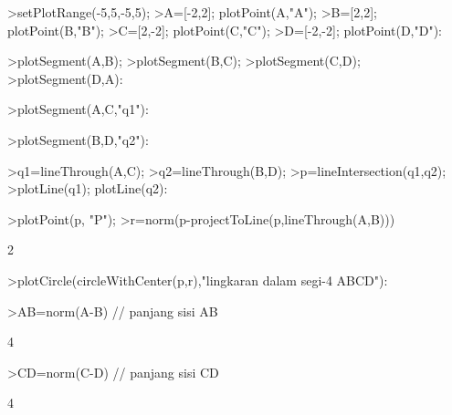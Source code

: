 \documentclass[12pt,Times new roman,letterpaper]{book}
\begin{document}
\begin{eulernootebook}
\begin{eulercomment}
\begin{eulercomment}
\begin{eulernootebook}
\begin{eulercomment}
\begin{eulercomment}
\begin{eulercomment}
\begin{eulercomment}
\begin{eulercomment}
\begin{eulercomment}
\begin{eulernotebook}
\begin{eulercomment}
\begin{eulercomment}
\begin{eulercomment}
\begin{eulercomment}
\begin{eulercomment}
\begin{eulercomment}
\end{eulercomment}
\begin{eulerprompt}
>setPlotRange(-5,5,-5,5);
>A=[-2,2]; plotPoint(A,"A");
>B=[2,2]; plotPoint(B,"B");
>C=[2,-2]; plotPoint(C,"C");
>D=[-2,-2]; plotPoint(D,"D"):
\end{eulerprompt}
\begin{eulerprompt}
>plotSegment(A,B);
>plotSegment(B,C);
>plotSegment(C,D);
>plotSegment(D,A):
\end{eulerprompt}
\begin{eulerprompt}
>plotSegment(A,C,"q1"):
\end{eulerprompt}
\begin{eulerprompt}
>plotSegment(B,D,"q2"):
\end{eulerprompt}
\begin{eulerprompt}
>q1=lineThrough(A,C);
>q2=lineThrough(B,D);
>p=lineIntersection(q1,q2);
>plotLine(q1); plotLine(q2):
\end{eulerprompt}
\begin{eulerprompt}
>plotPoint(p, "P");
>r=norm(p-projectToLine(p,lineThrough(A,B)))
\end{eulerprompt}
\begin{euleroutput}
  2
\end{euleroutput}
\begin{eulerprompt}
>plotCircle(circleWithCenter(p,r),"lingkaran dalam segi-4 ABCD"):
\end{eulerprompt}
\begin{eulerprompt}
>AB=norm(A-B) // panjang sisi AB
\end{eulerprompt}
\begin{euleroutput}
  4
\end{euleroutput}
\begin{eulerprompt}
>CD=norm(C-D) // panjang sisi CD
\end{eulerprompt}
\begin{euleroutput}
  4
\end{euleroutput}

\end{eulercomment}
\end{eulercomment}
\end{eulercomment}
\end{eulercomment}
\end{eulercomment}
\end{eulernotebook}
\end{eulercomment}
\end{eulercomment}
\end{eulercomment}
\end{eulercomment}
\end{eulercomment}
\end{eulercomment}
\end{eulernootebook}
\end{eulercomment}
\end{eulercomment}
\end{eulernootebook}
\end{document}

